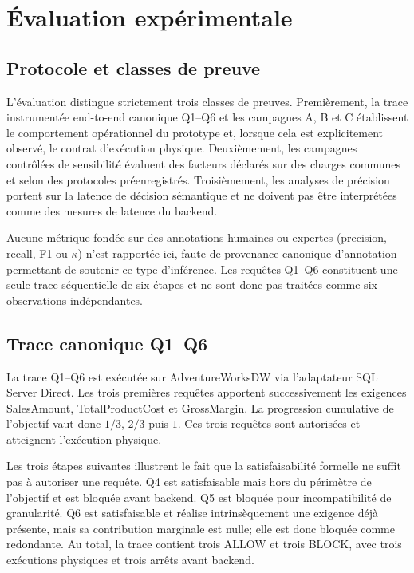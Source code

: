\section{Évaluation expérimentale}
\label{sec:evaluation-experimentale}

\subsection{Protocole et classes de preuve}

L'évaluation distingue strictement trois classes de preuves.
Premièrement, la trace instrumentée end-to-end canonique Q1--Q6 et
les campagnes A, B et C établissent le comportement opérationnel du
prototype et, lorsque cela est explicitement observé, le contrat
d'exécution physique. Deuxièmement, les campagnes contrôlées de
sensibilité évaluent des facteurs déclarés sur des charges communes
et selon des protocoles préenregistrés. Troisièmement, les analyses de
précision portent sur la latence de décision sémantique et ne doivent
pas être interprétées comme des mesures de latence du backend.

Aucune métrique fondée sur des annotations humaines ou expertes
(precision, recall, F1 ou $\kappa$) n'est rapportée ici, faute de
provenance canonique d'annotation permettant de soutenir ce type
d'inférence. Les requêtes Q1--Q6 constituent une seule trace
séquentielle de six étapes et ne sont donc pas traitées comme six
observations indépendantes.

\subsection{Trace canonique Q1--Q6}

La trace Q1--Q6 est exécutée sur AdventureWorksDW via l'adaptateur
SQL Server Direct. Les trois premières requêtes apportent
successivement les exigences SalesAmount, TotalProductCost et
GrossMargin. La progression cumulative de l'objectif vaut donc
$1/3$, $2/3$ puis $1$. Ces trois requêtes sont autorisées et atteignent
l'exécution physique.

Les trois étapes suivantes illustrent le fait que la satisfaisabilité
formelle ne suffit pas à autoriser une requête. Q4 est satisfaisable
mais hors du périmètre de l'objectif et est bloquée avant backend. Q5
est bloquée pour incompatibilité de granularité. Q6 est satisfaisable
et réalise intrinsèquement une exigence déjà présente, mais sa
contribution marginale est nulle; elle est donc bloquée comme
redondante. Au total, la trace contient trois ALLOW et trois BLOCK,
avec trois exécutions physiques et trois arrêts avant backend.

